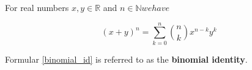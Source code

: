 \documentclass[a4paper, 11pt]{article}
\begin{document}
For real numbers $x, y \in \mathbb{R}$ and $n \in \mathbb{N} we have$

    \begin{equation}\label{binomial_id}
    (x+y)^n = \sum_{k=0}^{n}\binom{n}{k}x^{n-k}y^{k}
\end{equation}


Formular \eqref{binomial_id} is referred to as the \textbf{binomial identity}.
\end{document}
